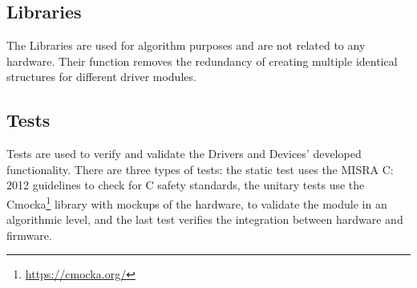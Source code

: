 \subsection{Libraries}

The Libraries are used for algorithm purposes and are not related to any hardware. Their function removes the redundancy of creating multiple identical structures for different driver modules.

\subsection{Tests}

Tests are used to verify and validate the Drivers and Devices' developed functionality. There are three types of tests: the static test uses the MISRA C: 2012 \cite{misrac2012} guidelines to check for C safety standards, the unitary tests use the Cmocka\footnote{\href{https://cmocka.org/}{https://cmocka.org/}} library with mockups of the hardware, to validate the module in an algorithmic level, and the last test verifies the integration between hardware and firmware.
